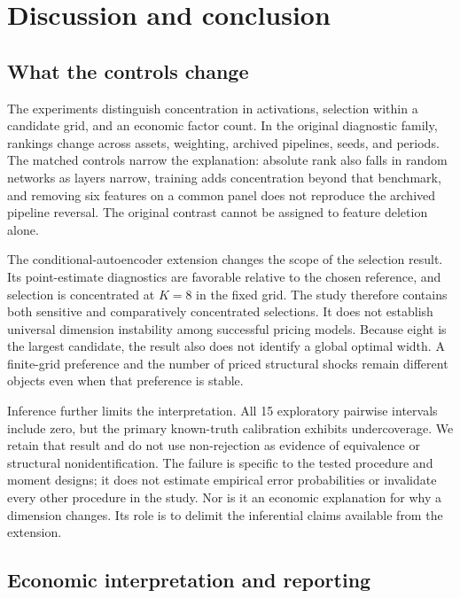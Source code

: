 \section{Discussion and conclusion}

\subsection{What the controls change}

The experiments distinguish concentration in activations, selection within a candidate grid, and an economic factor count. In the original diagnostic family, rankings change across assets, weighting, archived pipelines, seeds, and periods. The matched controls narrow the explanation: absolute rank also falls in random networks as layers narrow, training adds concentration beyond that benchmark, and removing six features on a common panel does not reproduce the archived pipeline reversal. The original contrast cannot be assigned to feature deletion alone.

The conditional-autoencoder extension changes the scope of the selection result. Its point-estimate diagnostics are favorable relative to the chosen reference, and selection is concentrated at $K=8$ in the fixed grid. The study therefore contains both sensitive and comparatively concentrated selections. It does not establish universal dimension instability among successful pricing models. Because eight is the largest candidate, the result also does not identify a global optimal width. A finite-grid preference and the number of priced structural shocks remain different objects even when that preference is stable.

Inference further limits the interpretation. All 15 exploratory pairwise intervals include zero, but the primary known-truth calibration exhibits undercoverage. We retain that result and do not use non-rejection as evidence of equivalence or structural nonidentification. The failure is specific to the tested procedure and moment designs; it does not estimate empirical error probabilities or invalidate every other procedure in the study. Nor is it an economic explanation for why a dimension changes. Its role is to delimit the inferential claims available from the extension.

\subsection{Economic interpretation and reporting}

